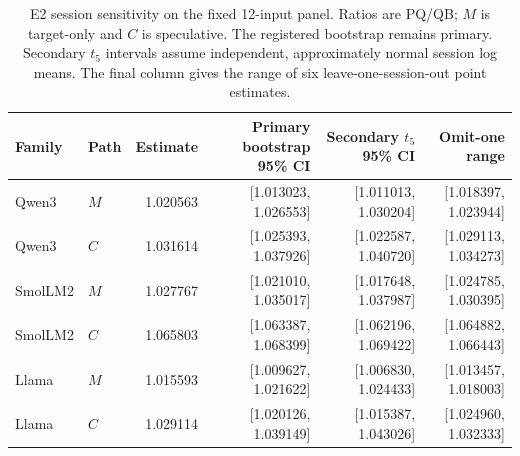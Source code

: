 \begin{table}[t]\centering\small
\caption{E2 session sensitivity on the fixed 12-input panel. Ratios are PQ/QB; $M$ is target-only and $C$ is speculative. The registered bootstrap remains primary. Secondary $t_5$ intervals assume independent, approximately normal session log means. The final column gives the range of six leave-one-session-out point estimates.}\label{tab:e2sensitivity}
\begin{tabular}{@{}llrrrr@{}}\toprule
Family & Path & Estimate & Primary bootstrap 95\% CI & Secondary $t_5$ 95\% CI & Omit-one range\\\midrule
Qwen3 & $M$ & 1.020563 & [1.013023, 1.026553] & [1.011013, 1.030204] & [1.018397, 1.023944]\\
Qwen3 & $C$ & 1.031614 & [1.025393, 1.037926] & [1.022587, 1.040720] & [1.029113, 1.034273]\\
SmolLM2 & $M$ & 1.027767 & [1.021010, 1.035017] & [1.017648, 1.037987] & [1.024785, 1.030395]\\
SmolLM2 & $C$ & 1.065803 & [1.063387, 1.068399] & [1.062196, 1.069422] & [1.064882, 1.066443]\\
Llama & $M$ & 1.015593 & [1.009627, 1.021622] & [1.006830, 1.024433] & [1.013457, 1.018003]\\
Llama & $C$ & 1.029114 & [1.020126, 1.039149] & [1.015387, 1.043026] & [1.024960, 1.032333]\\
\bottomrule\end{tabular}
\end{table}
